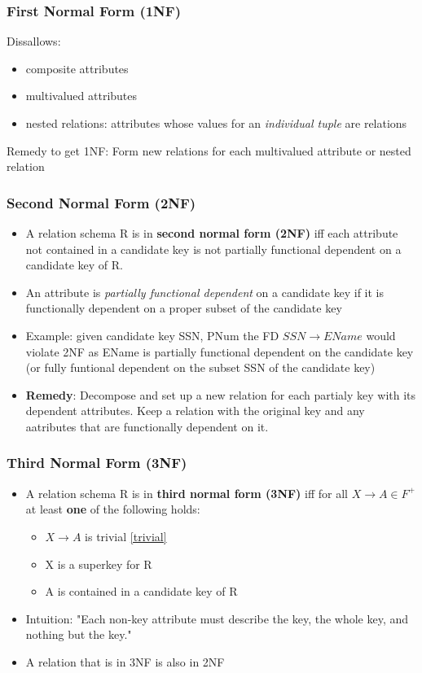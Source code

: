 \subsubsection{First Normal Form (1NF)}
Dissallows: \begin{itemize}[label=\(\rhd\)]
    \item composite attributes
    \item multivalued attributes 
    \item nested relations: attributes whose values for an \textit{individual tuple} are relations 
\end{itemize}
Remedy to get 1NF: Form new relations for each multivalued attribute or nested relation

\subsubsection{Second Normal Form (2NF)}
\begin{itemize}[label=\(\rhd\)]
    \item A relation schema R is in \textbf{second normal form (2NF)} iff each attribute not contained in a candidate key is not partially functional dependent on a candidate key of R. 
    \item An attribute is \textit{partially functional dependent} on a candidate key if it is functionally dependent on a proper subset of the candidate key
    \item Example: given candidate key SSN, PNum the FD $SSN \rightarrow EName$ would violate 2NF as EName is partially functional dependent on the candidate key (or fully funtional dependent on the subset SSN of the candidate key)
    \item \textbf{Remedy}: Decompose and set up a new relation for each partialy key with its dependent attributes. Keep a relation with the original key and any aatributes that are functionally dependent on it. 
\end{itemize}

\subsubsection{Third Normal Form (3NF)}

\begin{itemize}[label=\(\rhd\)]
    \item A relation schema R is in \textbf{third normal form (3NF)} iff for all $X\rightarrow A \in F^+$ at least \textbf{one} of the following holds:
    \begin{itemize}[label=\(\rhd\)]
        \item $X\rightarrow A$ is trivial \ref{trivial}
        \item X is a superkey for R
        \item A is contained in a candidate key of R
    \end{itemize}
    \item Intuition: "Each non-key attribute must describe the key, the whole key, and nothing but the key."
    \item A relation that is in 3NF is also in 2NF 
\end{itemize}

